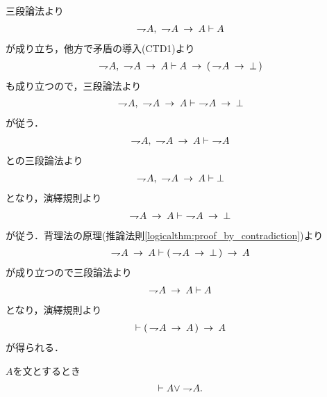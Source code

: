 	\begin{sketch}
		三段論法より
		\begin{align}
			\negation A,\ \negation A \rarrow A \vdash A
		\end{align}
		が成り立ち，他方で矛盾の導入(CTD1)より
		\begin{align}
			\negation A,\ \negation A \rarrow A
			\vdash A \rarrow (\, \negation A \rarrow \bot\, )
		\end{align}
		も成り立つので，三段論法より
		\begin{align}
			\negation A,\ \negation A \rarrow A \vdash\ \negation A \rarrow \bot
		\end{align}
		が従う．
		\begin{align}
			\negation A,\ \negation A \rarrow A \vdash\ \negation A
		\end{align}
		との三段論法より
		\begin{align}
			\negation A,\ \negation A \rarrow A \vdash \bot
		\end{align}
		となり，演繹規則より
		\begin{align}
			\negation A \rarrow A \vdash\ \negation A \rarrow \bot
		\end{align}
		が従う．背理法の原理(推論法則\ref{logicalthm:proof_by_contradiction})より
		\begin{align}
			\negation A \rarrow A \vdash (\, \negation A \rarrow \bot\, )
			\rarrow A
		\end{align}
		が成り立つので三段論法より
		\begin{align}
			\negation A \rarrow A \vdash A
		\end{align}
		となり，演繹規則より
		\begin{align}
			\vdash (\, \negation A \rarrow A\, ) \rarrow A
		\end{align}
		が得られる．
		\QED
	\end{sketch}
	
	\begin{screen}
		\begin{logicalthm}[排中律]\label{logicalthm:law_of_excluded_middle}
			$A$を文とするとき
			\begin{align}
				\vdash A \vee \negation A.
			\end{align}
		\end{logicalthm}
	\end{screen}
	
